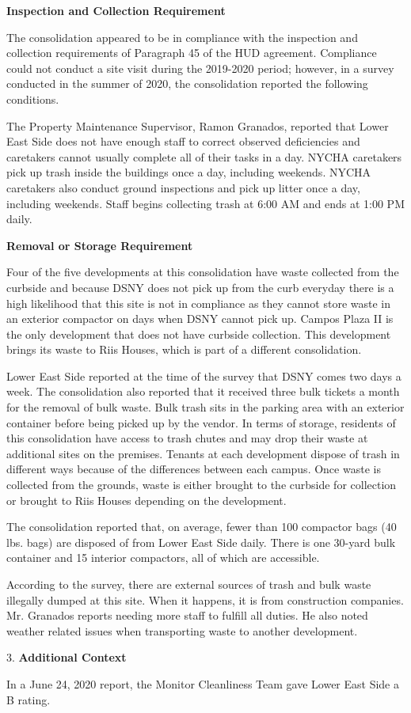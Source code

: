 
\textbf{Inspection and Collection Requirement}

The consolidation appeared to be in compliance with the inspection and collection requirements of Paragraph 45 of the HUD agreement. Compliance could not conduct a site visit during the 2019-2020 period; however, in a survey conducted in the summer of 2020, the consolidation reported the following conditions.

The Property Maintenance Supervisor, Ramon Granados, reported that Lower East Side does not have enough staff to correct observed deficiencies and caretakers cannot usually complete all of their tasks in a day. NYCHA caretakers pick up trash inside the buildings once a day, including weekends. NYCHA caretakers also conduct ground inspections and pick up litter once a day, including weekends. Staff begins collecting trash at 6:00 AM and ends at 1:00 PM daily. 

\textbf{Removal or Storage Requirement}

Four of the five developments at this consolidation have waste collected from the curbside and because DSNY does not pick up from the curb everyday there is a high likelihood that this site is not in compliance as they cannot store waste in an exterior compactor on days when DSNY cannot pick up. Campos Plaza II is the only development that does not have curbside collection. This development brings its waste to Riis Houses, which is part of a different consolidation.

Lower East Side reported at the time of the survey that DSNY comes two days a week. The consolidation also reported that it received three bulk tickets a month for the removal of bulk waste.  Bulk trash sits in the parking area with an exterior container before being picked up by the vendor. In terms of storage, residents of this consolidation have access to trash chutes and may drop their waste at  additional sites on the premises. Tenants at each development dispose of trash in different ways because of the differences between each campus. Once waste is collected from the grounds, waste is either brought to the curbside for collection or brought to Riis Houses depending on the development. 

The consolidation reported that, on average, fewer than 100 compactor bags (40 lbs. bags)  are disposed of from Lower East Side daily. There is one 30-yard bulk container and 15 interior compactors, all of which are accessible. 

According to the survey, there are external sources of trash and bulk waste illegally dumped at this site. When it happens, it is from construction companies. Mr. Granados reports needing more staff to fulfill all duties. He also noted weather related issues when transporting waste to another development. 

3. \textbf{Additional Context} 

In a June 24, 2020 report, the Monitor Cleanliness Team gave Lower East Side a B rating. 